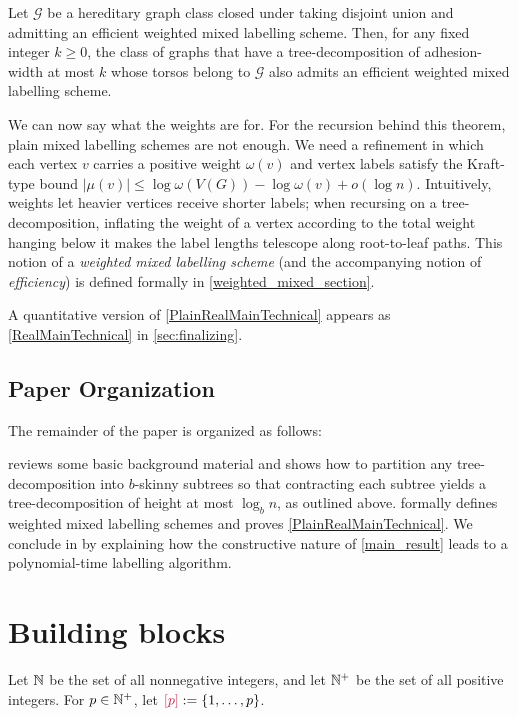 \documentclass{patmorin}
\makeatletter
\renewcommand{\le}{\leqslant}
\renewcommand{\geq}{\geqslant}
\newcommand{\defin}[1]{\emph{\textcolor{brightmaroon}{#1}}}
\def\mathcolor#1#{\@mathcolor{#1}}
\def\@mathcolor#1#2#3{%
  \protect\leavevmode
  \begingroup
    \color#1{#2}#3%
  \endgroup
}
\newcommand{\mathdefin}[1]{\mathcolor{brightmaroon}{#1}}
\DeclarePairedDelimiter{\set}{\{}{\}}
\newcommand{\calG}{\mathcal{G}}
\makeatother
\begin{document}
\begin{thm}\label{PlainRealMainTechnical}
  Let $\calG$ be a hereditary graph class closed under taking disjoint union and admitting an efficient weighted mixed labelling scheme. Then, for any fixed integer $k\geq 0$, the class of graphs that have a tree-decomposition of adhesion-width at most $k$ whose torsos belong to $\calG$ also admits an efficient weighted mixed labelling scheme.
\end{thm}

We can now say what the weights are for. For the recursion behind this theorem, plain mixed labelling schemes are not enough. We need a refinement in which each vertex $v$ carries a positive weight $\omega(v)$ and vertex labels satisfy the Kraft-type bound $|\mu(v)|\le\log\omega(V(G))-\log\omega(v)+o(\log n)$. Intuitively, weights let heavier vertices receive shorter labels; when recursing on a tree-decomposition, inflating the weight of a vertex according to the total weight hanging below it makes the label lengths telescope along root-to-leaf paths. This notion of a \defin{weighted mixed labelling scheme} (and the accompanying notion of \emph{efficiency}) is defined formally in \cref{weighted_mixed_section}.


A quantitative version of \cref{PlainRealMainTechnical} appears as \cref{RealMainTechnical} in \cref{sec:finalizing}.

\subsection{Paper Organization}

The remainder of the paper is organized as follows:  

 reviews some basic background material and shows how to
partition any tree-decomposition into $b$-skinny subtrees so that contracting
each subtree yields a tree-decomposition of height at most $\log_b n$, as outlined above.     formally defines weighted mixed labelling schemes and proves \cref{PlainRealMainTechnical}.
We conclude in  by explaining how the constructive nature of \cref{main_result} leads to a
polynomial-time labelling algorithm.

\section{Building blocks}\label{building_blocks}

Let \defin{$\mathbb{N}$} be the set of all nonnegative integers, and let \defin{$\mathbb{N}^+$} be the set of all positive integers.  For $p\in\mathbb{N}^+$, let $\mathdefin{[p]} := \set{1,\dots,p}$. 
\end{document}
